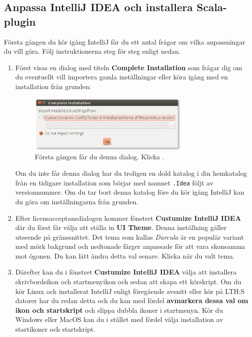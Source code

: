 \subsection{Anpassa IntelliJ IDEA och installera Scala-plugin}\label{appendix:ide:intellij:tweak}
Första gången du kör igång IntelliJ får du ett antal frågor om vilka anpassningar du vill göra. Följ instruktionerna steg för steg enligt nedan.
\begin{enumerate}

\item Först visas en dialog med titeln \textbf{Complete Installation} som frågar dig om du eventuellt vill importera gamla inställningar eller köra igång med en installation från grunden:
\begin{figure}[H]
\centering
\includegraphics[width=0.75\textwidth]{../img/intellij/idea1-complete-installation.png}
\caption {Första gången får du denna dialog. Klicka .}
\label{fig:eclipse:import-projects}
\end{figure}
Om du inte får denna dialog har du troligen en dold katalog i din hemkatalog från en tidigare installation som börjar med namnet \texttt{.Idea} följt av versionnummer. Om du tar bort denna katalog före du kör igång IntelliJ kan du göra om inställningarna från grunden.

\item Efter licensacceptansdialogen kommer fönstret \textbf{Custumize IntelliJ IDEA} där du först får välja att ställa in \textbf{UI Theme}. Denna inställning gäller utseende på gränssnittet. Det tema som kallas \textit{Darcula} är en populär variant med mörk bakgrund och nedtonade färger anpassade för att vara skonsamma mot ögonen. Du kan lätt ändra detta val senare. Klicka  när du valt tema.

\item Därefter kan du i fönstret \textbf{Custumize IntelliJ IDEA} välja att installera skrivbordsikon och startmenyikon och sedan att skapa ett körskript. Om du kör Linux och installerat IntelliJ enligt föregående avsnitt eller kör på LTH:S datorer har du redan detta och du kan med fördel \textbf{avmarkera dessa val om ikon och startskript} och slippa dubbla ikoner i startmenyn. Kör du Windows eller MacOS kan du i stället med fördel välja installation av startikoner och startskript.


\end{enumerate}
